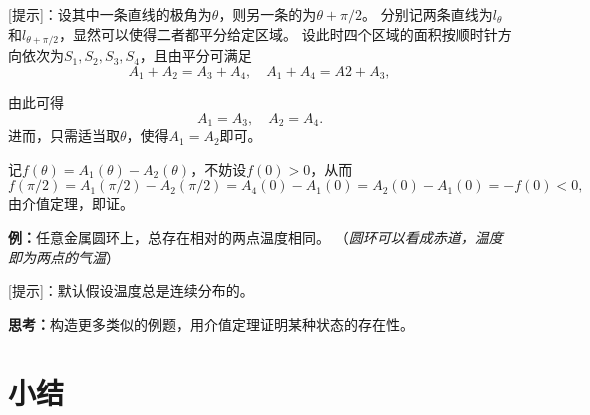 [提示]：设其中一条直线的极角为$\theta$，则另一条的为$\theta+\pi/2$。
分别记两条直线为$l_{\theta}$和$l_{\theta+\pi/2}$，显然可以使得二者都平分给定区域。
设此时四个区域的面积按顺时针方向依次为$S_1,S_2,S_3,S_4$，且由平分可满足
$$A_1+A_2=A_3+A_4,\quad A_1+A_4=A2+A_3,$$

\begin{center}
\end{center}

由此可得
$$A_1=A_3,\quad A_2=A_4.$$
进而，只需适当取$\theta$，使得$A_1=A_2$即可。

记$f(\theta)=A_1(\theta)-A_2(\theta)$，不妨设$f(0)>0$，从而
$$f(\pi/2)=A_1(\pi/2)-A_2(\pi/2)=A_4(0)-A_1(0)=A_2(0)-A_1(0)=-f(0)<0,$$
由介值定理，即证。

{\bf 例：}任意金属圆环上，总存在相对的两点温度相同。
（{\it 圆环可以看成赤道，温度即为两点的气温}）

[提示]：默认假设温度总是连续分布的。

{\bf 思考：}构造更多类似的例题，用介值定理证明某种状态的存在性。

% 

\section*{小结}

